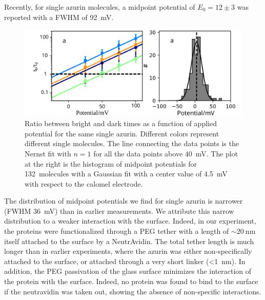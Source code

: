 Recently, for single azurin molecules, a midpoint potential of $E_0=12\pm3$ was reported with a FWHM of \SI{92}{\mV}.\cite{akkilic2014chemically-induced}\\
\begin{figure}
	\centering
	\includegraphics[width=\textwidth]{Figure_2_midpoint}
	\caption{Ratio between bright and dark times as a function of applied potential for the same single azurin.
	Different colors represent different single molecules.
	The line connecting the data points is the Nernst fit with $n=1$ for all the data points above \SI{40}{\mV}.
	The plot at the right is the histogram of midpoint potentials for \SI{132}{ molecules} with a Gaussian fit with a center value of \SI{4.5}{\mV} with respect to the calomel electrode.}
	\label{fig:midpoint}
\end{figure}

The distribution of midpoint potentials we find for single azurin is narrower (FWHM \SI{36}{\mV}) than in earlier measurements. We attribute this narrow distribution to a weaker interaction with the surface. Indeed, in our experiment, the proteins were functionalized through a PEG tether with a length of ${\sim}\SI{20}{\nm}$ itself attached to the surface by a NeutrAvidin. The total tether length is much longer than in earlier experiments, where the azurin was either non-specifically attached to the surface, or attached through a very short linker (\SI{<1}{\nm}).
In addition, the PEG passivation of the glass surface minimizes the interaction of the protein with the surface. Indeed, no protein was found to bind to the surface if the neutravidin was taken out, showing the absence of non-specific interactions.

